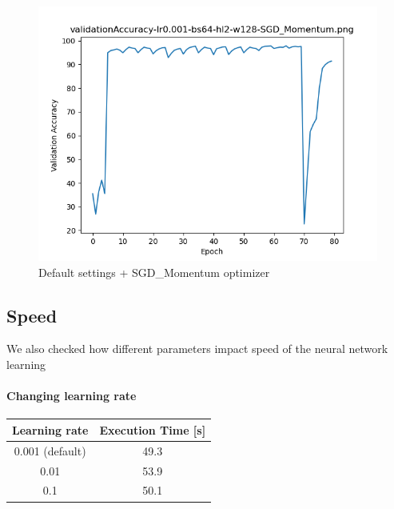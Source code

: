 \documentclass{article}[12pt]
\begin{document}
        \begin{figure}[H]
        \includegraphics[width=\linewidth]{testsResults/validationAccuracy/validationAccuracy-lr0.001-bs64-hl2-w128-SGD_Momentum.png}
        \caption{Default settings + SGD\_Momentum optimizer}
        \endminipage
    \end{figure}

    \subsection{Speed}
    We also checked how different parameters impact speed of the neural network learning 

    \paragraph{Changing learning rate}
    \begin{center}
        \begin{tabular}{ | c | c |  }
            \hline
         Learning rate & Execution Time [s] \\ 
         \hline
         0.001 (default) & 49.3 \\  
         \hline
         0.01 & 53.9 \\    
         \hline
         0.1 & 50.1 \\    
         \hline
    \end{tabular}
    \end{center}
\end{document}
